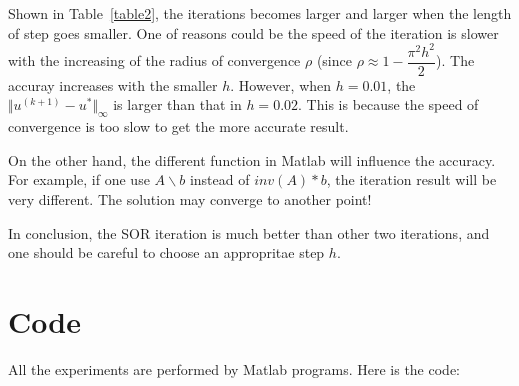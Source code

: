 \documentclass[a4paper,11pt]{article}
\begin{document}
Shown in Table~\ref{table2}, the iterations becomes larger and larger when the length of step goes smaller. One of reasons could be the speed of the iteration is slower with the increasing of the radius of convergence $\rho$ (since $\rho\approx 1-\dfrac{\pi^2 h^2}{2}$). The accuray increases with the smaller $h$. However, when $h=0.01$, the $\Vert u^{(k+1)}-u^{*}\Vert_\infty$ is larger than that in $h=0.02$. This is because the speed of convergence is too slow to get the more accurate result.

On the other hand, the different function in Matlab will influence the accuracy. For example, if one use $A\backslash b$ instead of $\textit{inv}(A)*b$, the iteration result will be very different. The solution may converge to another point!

In conclusion, the SOR iteration is much better than other two iterations, and one should be careful to choose an appropritae step $h$.


\section{Code}
All the experiments are performed by Matlab programs. Here is the code:


\end{document}
